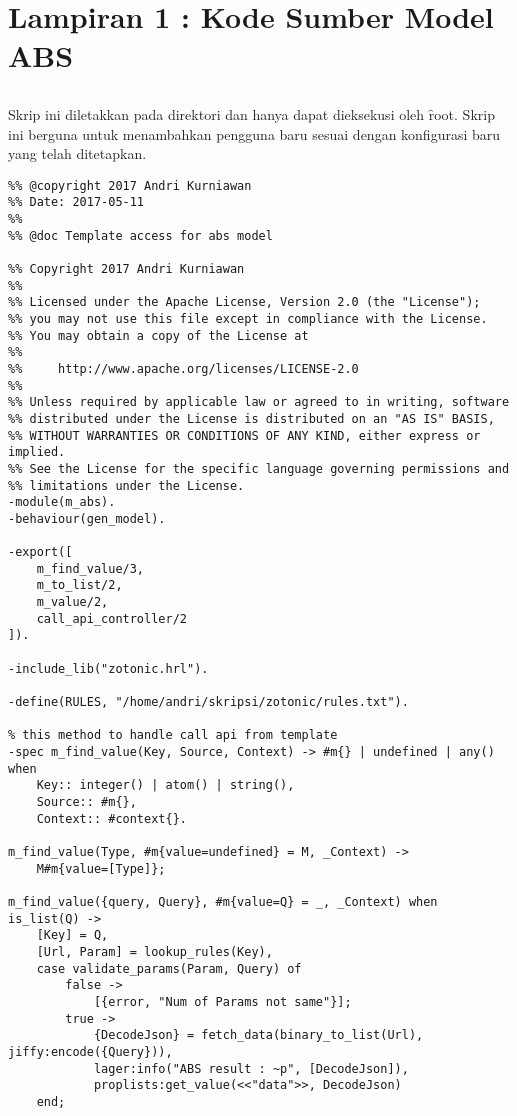 \chapter*{Lampiran 1 : Kode Sumber Model ABS}
\section*{} \label{cha:lampir-abs}
Skrip ini diletakkan pada direktori  dan hanya dapat dieksekusi oleh \f{root}. Skrip ini berguna untuk menambahkan pengguna baru sesuai dengan konfigurasi baru yang telah ditetapkan.
\begin{lstlisting}[style=L,caption={Skrip menambahkan pengguna baru},label={lst:mabs}]
%% @author Andri Kurniawan <andrikurniawan.id@gmail.com>
%% @copyright 2017 Andri Kurniawan
%% Date: 2017-05-11
%%
%% @doc Template access for abs model

%% Copyright 2017 Andri Kurniawan
%%
%% Licensed under the Apache License, Version 2.0 (the "License");
%% you may not use this file except in compliance with the License.
%% You may obtain a copy of the License at
%%
%%     http://www.apache.org/licenses/LICENSE-2.0
%%
%% Unless required by applicable law or agreed to in writing, software
%% distributed under the License is distributed on an "AS IS" BASIS,
%% WITHOUT WARRANTIES OR CONDITIONS OF ANY KIND, either express or implied.
%% See the License for the specific language governing permissions and
%% limitations under the License.
-module(m_abs).
-behaviour(gen_model).

-export([
	m_find_value/3,
	m_to_list/2,
	m_value/2,
	call_api_controller/2
]).

-include_lib("zotonic.hrl").

-define(RULES, "/home/andri/skripsi/zotonic/rules.txt").

% this method to handle call api from template
-spec m_find_value(Key, Source, Context) -> #m{} | undefined | any() when
    Key:: integer() | atom() | string(),
    Source:: #m{},
    Context:: #context{}.

m_find_value(Type, #m{value=undefined} = M, _Context) ->
    M#m{value=[Type]};

m_find_value({query, Query}, #m{value=Q} = _, _Context) when is_list(Q) ->
	[Key] = Q,
	[Url, Param] = lookup_rules(Key),
	case validate_params(Param, Query) of
		false ->
			[{error, "Num of Params not same"}];
		true ->
			{DecodeJson} = fetch_data(binary_to_list(Url), jiffy:encode({Query})),
			lager:info("ABS result : ~p", [DecodeJson]),
			proplists:get_value(<<"data">>, DecodeJson)
	end;


\end{lstlisting}
